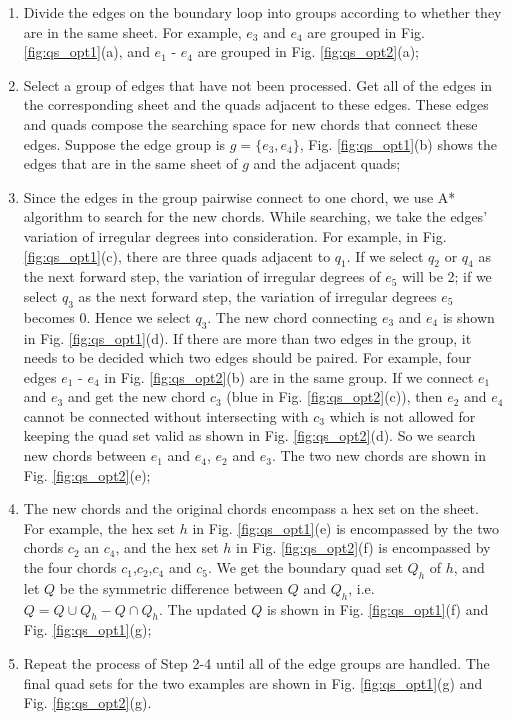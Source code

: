 \documentclass[final,5p,times,twocolumn]{elsarticle}
\begin{document}
\begin{enumerate}
  \item Divide the edges on the boundary loop into groups according to whether they are in the same sheet. For example, $e_3$ and $e_4$ are grouped in Fig. \ref{fig:qs_opt1}(a), and $e_1$ - $e_4$ are grouped in Fig. \ref{fig:qs_opt2}(a);
  \item Select a group of edges that have not been processed. Get all of the edges in the corresponding sheet and the quads adjacent to these edges. These edges and quads compose the searching space for new chords that connect these edges. Suppose the edge group is $g=\{e_3,e_4\}$, Fig. \ref{fig:qs_opt1}(b) shows the edges that are in the same sheet of $g$ and the adjacent quads;
  \item Since the edges in the group pairwise connect to one chord, we use A* algorithm to search for the new chords. While searching, we take the edges' variation of irregular degrees into consideration. For example, in Fig. \ref{fig:qs_opt1}(c), there are three quads adjacent to $q_1$. If we select $q_2$ or $q_4$ as the next forward step, the variation of irregular degrees of $e_5$ will be 2; if we select $q_3$ as the next forward step, the variation of irregular degrees $e_5$ becomes 0. Hence we select $q_3$. The new chord connecting $e_3$ and $e_4$ is shown in Fig. \ref{fig:qs_opt1}(d). If there are more than two edges in the group, it needs to be decided which two edges should be paired. For example, four edges $e_1$ - $e_4$ in Fig. \ref{fig:qs_opt2}(b) are in the same group. If we connect $e_1$ and $e_3$ and get the new chord $c_3$ (blue in Fig. \ref{fig:qs_opt2}(c)), then $e_2$ and $e_4$ cannot be connected without intersecting with $c_3$ which is not allowed for keeping the quad set valid as shown in Fig. \ref{fig:qs_opt2}(d). So we search new chords between $e_1$ and $e_4$, $e_2$ and $e_3$. The two new chords are shown in Fig. \ref{fig:qs_opt2}(e);
  \item The new chords and the original chords encompass a hex set on the sheet. For example, the hex set $h$ in Fig. \ref{fig:qs_opt1}(e) is encompassed by the two chords $c_2$ an $c_4$, and the hex set $h$ in Fig. \ref{fig:qs_opt2}(f) is encompassed by the four chords $c_1$,$c_2$,$c_4$ and $c_5$. We get the boundary quad set $Q_h$ of $h$, and let $Q$ be the symmetric difference between $Q$ and $Q_h$, i.e. $Q=Q\cup Q_h-Q\cap Q_h$. The updated $Q$ is shown in Fig. \ref{fig:qs_opt1}(f) and Fig. \ref{fig:qs_opt1}(g);
  \item Repeat the process of Step 2-4 until all of the edge groups are handled. The final quad sets for the two examples are shown in Fig. \ref{fig:qs_opt1}(g) and Fig. \ref{fig:qs_opt2}(g).
\end{enumerate}
\end{document}
